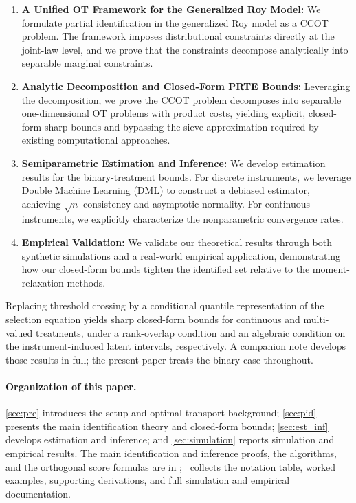 \begin{enumerate}
    \item \textbf{A Unified OT Framework for the Generalized Roy Model:} We formulate partial identification in the generalized Roy model as a CCOT problem. The framework imposes distributional constraints directly at the joint-law level, and we prove that the constraints decompose analytically into separable marginal constraints.
    \item \textbf{Analytic Decomposition and Closed-Form PRTE Bounds:} Leveraging the decomposition, we prove the CCOT problem decomposes into separable one-dimensional OT problems with product costs, yielding explicit, closed-form sharp bounds and bypassing the sieve approximation required by existing computational approaches.
    \item \textbf{Semiparametric Estimation and Inference:} We develop estimation results for the binary-treatment bounds. For discrete instruments, we leverage Double Machine Learning (DML) to construct a debiased estimator, achieving $\sqrt{n}$-consistency and asymptotic normality. For continuous instruments, we explicitly characterize the nonparametric convergence rates.
    \item \textbf{Empirical Validation:} We validate our theoretical results through both synthetic simulations and a real-world empirical application, demonstrating how our closed-form bounds tighten the identified set relative to the moment-relaxation methods.
\end{enumerate}

Replacing threshold crossing by a conditional quantile representation of the selection equation yields sharp closed-form bounds for continuous and multi-valued treatments, under a rank-overlap condition and an algebraic condition on the instrument-induced latent intervals, respectively. A companion note develops those results in full; the present paper treats the binary case throughout.



\paragraph{Organization of this paper.} \cref{sec:pre} introduces the setup and optimal transport background; \cref{sec:pid} presents the main identification theory and closed-form bounds; \cref{sec:est_inf} develops estimation and inference; and \cref{sec:simulation} reports simulation and empirical results. The main identification and inference proofs, the algorithms, and the orthogonal score formulas are in \supplocation\suppnumnote; \oalocation\ collects the notation table, worked examples, supporting derivations, and full simulation and empirical documentation.

